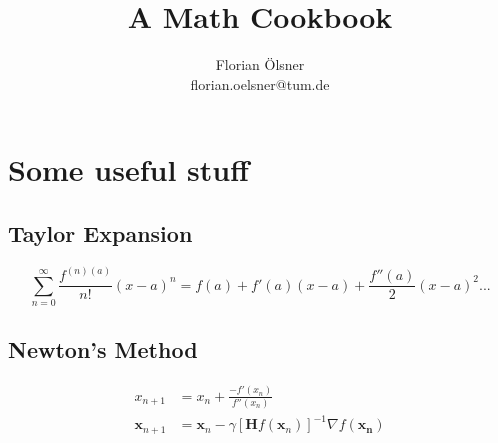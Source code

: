 \documentclass[%
	pdftex,
	12pt,								%
	parskip=half,				%
	headheight = 12pt,	%
	headsepline,				%
	footsepline,				%
	footheight = 16pt,	%
	DIV=calc,						%
	BCOR=8mm,						%
	headinclude=false,	%
	footinclude=false,	%
]{scrreprt}						%
\title{A Math Cookbook}
\author{Florian \"Olsner\\florian.oelsner@tum.de}
\begin{document}
\maketitle
\newpage

 \chapter{Some useful stuff}
 \section{Taylor Expansion}
 \begin{equation}
 	\sum_{n=0}^{\infty} \frac{f^{(n)(a)}}{n!}(x - a)^n = f(a) + f'(a) (x-a) + \frac{f''(a)}{2}(x-a)^2 ...
 \end{equation}

 \section{Newton's Method}
 \begin{align}
 		x_{n+1} &= x_n + \frac{-f'(x_n)}{f''(x_n)} \\
		\bm{x}_{n+1} &= \bm{x}_n - \gamma[\bm{H} f(\bm{x}_n)]^{-1} \nabla f(\bm{x_n})
 \end{align}
\end{document}
